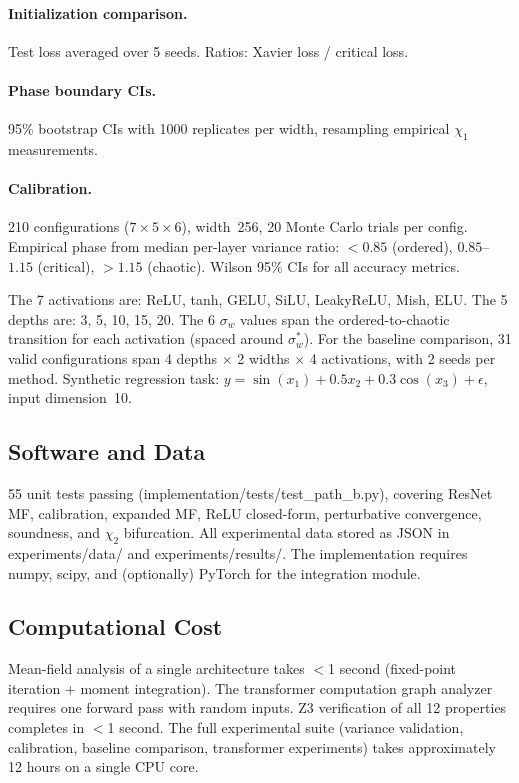\documentclass[10pt]{article}
\begin{document}
\paragraph{Initialization comparison.}
Test loss averaged over 5 seeds. Ratios: Xavier loss / critical loss.

\paragraph{Phase boundary CIs.}
95\% bootstrap CIs with 1000 replicates per width, resampling empirical $\chi_1$ measurements.

\paragraph{Calibration.}
210 configurations ($7 \times 5 \times 6$), width~256, 20 Monte Carlo trials per config.
Empirical phase from median per-layer variance ratio: $<0.85$ (ordered), $0.85$--$1.15$ (critical), $>1.15$ (chaotic).
Wilson 95\% CIs for all accuracy metrics.

The 7 activations are: ReLU, tanh, GELU, SiLU, LeakyReLU, Mish, ELU.
The 5 depths are: 3, 5, 10, 15, 20.
The 6 $\sigma_w$ values span the ordered-to-chaotic transition for each activation (spaced around $\sigma_w^*$).
For the baseline comparison, 31 valid configurations span 4 depths $\times$ 2 widths $\times$ 4 activations, with 2 seeds per method.
Synthetic regression task: $y = \sin(x_1) + 0.5x_2 + 0.3\cos(x_3) + \epsilon$, input dimension~10.

\subsection{Software and Data}

55 unit tests passing (implementation/tests/test\_path\_b.py), covering ResNet MF, calibration, expanded MF, ReLU closed-form, perturbative convergence, soundness, and $\chi_2$ bifurcation.
All experimental data stored as JSON in experiments/data/ and experiments/results/.
The implementation requires numpy, scipy, and (optionally) PyTorch for the integration module.

\subsection{Computational Cost}

Mean-field analysis of a single architecture takes $<$1 second (fixed-point iteration + moment integration).
The transformer computation graph analyzer requires one forward pass with random inputs.
Z3 verification of all 12 properties completes in $<$1 second.
The full experimental suite (variance validation, calibration, baseline comparison, transformer experiments) takes approximately 12 hours on a single CPU core.
\end{document}
